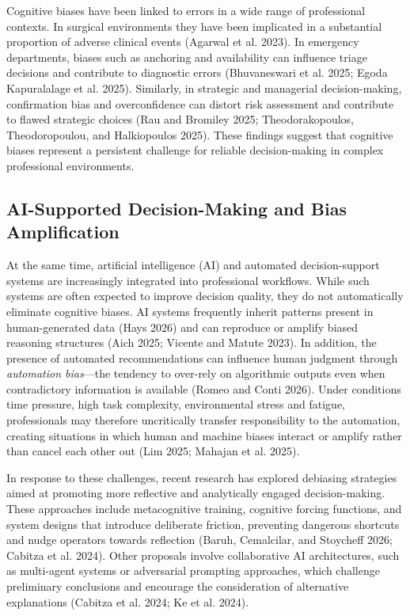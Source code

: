 \documentclass[
  manuscript,
  anonymous,
  review]{acmart}
\begin{document}
Cognitive biases have been linked to errors in a wide range of
professional contexts. In surgical environments they have been
implicated in a substantial proportion of adverse clinical events
(Agarwal et al. 2023). In emergency departments, biases such as
anchoring and availability can influence triage decisions and contribute
to diagnostic errors (Bhuvaneswari et al. 2025; Egoda Kapuralalage et
al. 2025). Similarly, in strategic and managerial decision-making,
confirmation bias and overconfidence can distort risk assessment and
contribute to flawed strategic choices (Rau and Bromiley 2025;
Theodorakopoulos, Theodoropoulou, and Halkiopoulos 2025). These findings
suggest that cognitive biases represent a persistent challenge for
reliable decision-making in complex professional environments.

\subsection{AI-Supported Decision-Making and Bias
Amplification}\label{ai-supported-decision-making-and-bias-amplification}

At the same time, artificial intelligence (AI) and automated
decision-support systems are increasingly integrated into professional
workflows. While such systems are often expected to improve decision
quality, they do not automatically eliminate cognitive biases. AI
systems frequently inherit patterns present in human-generated data
(Hays 2026) and can reproduce or amplify biased reasoning structures
(Aich 2025; Vicente and Matute 2023). In addition, the presence of
automated recommendations can influence human judgment through
\emph{automation bias}---the tendency to over-rely on algorithmic
outputs even when contradictory information is available (Romeo and
Conti 2026). Under conditions time pressure, high task complexity,
environmental stress and fatigue, professionals may therefore
uncritically transfer responsibility to the automation, creating
situations in which human and machine biases interact or amplify rather
than cancel each other out (Lim 2025; Mahajan et al. 2025).

In response to these challenges, recent research has explored debiasing
strategies aimed at promoting more reflective and analytically engaged
decision-making. These approaches include metacognitive training,
cognitive forcing functions, and system designs that introduce
deliberate friction, preventing dangerous shortcuts and nudge operators
towards reflection (Baruh, Cemalcilar, and Stoycheff 2026; Cabitza et
al. 2024). Other proposals involve collaborative AI architectures, such
as multi-agent systems or adversarial prompting approaches, which
challenge preliminary conclusions and encourage the consideration of
alternative explanations (Cabitza et al. 2024; Ke et al. 2024).
\end{document}

